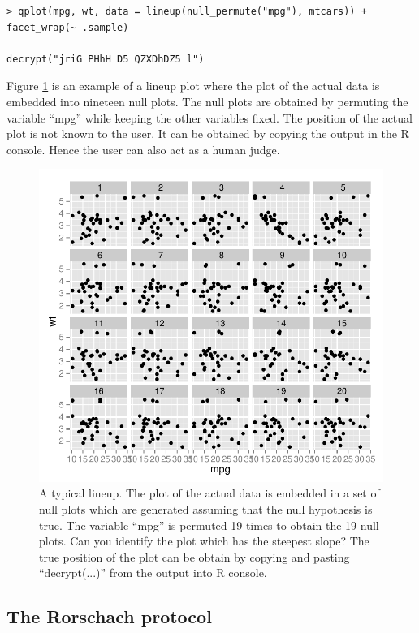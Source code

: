 \begin{verbatim}
> qplot(mpg, wt, data = lineup(null_permute("mpg"), mtcars)) + facet_wrap(~ .sample)

decrypt("jriG PHhH D5 QZXDhDZ5 l")
\end{verbatim}

Figure \ref{lineup-ex} is an example of a lineup plot where the plot of the actual data is embedded into nineteen null plots. The null plots are obtained by permuting the variable ``mpg'' while keeping the other variables fixed. The position of the actual plot is not known to the user. It can be obtained by copying the output in the R console. Hence the user can also act as a human judge. 

\begin{figure}[hbtp]
\begin{center}
\includegraphics[scale=1]{nullabor-lineup.pdf}
\caption{A typical lineup. The plot of the actual data is embedded in a set of null plots which are generated assuming that the null hypothesis is true. The variable ``mpg'' is permuted 19 times to obtain the 19 null plots. Can you identify the plot which has the steepest slope? The true position of the plot can be obtain by copying and pasting ``decrypt(...)'' from the output into R console.}
\label{lineup-ex}
\end{center}
\end{figure}

\subsection{The Rorschach protocol}\label{the-rorschach-protocol}

